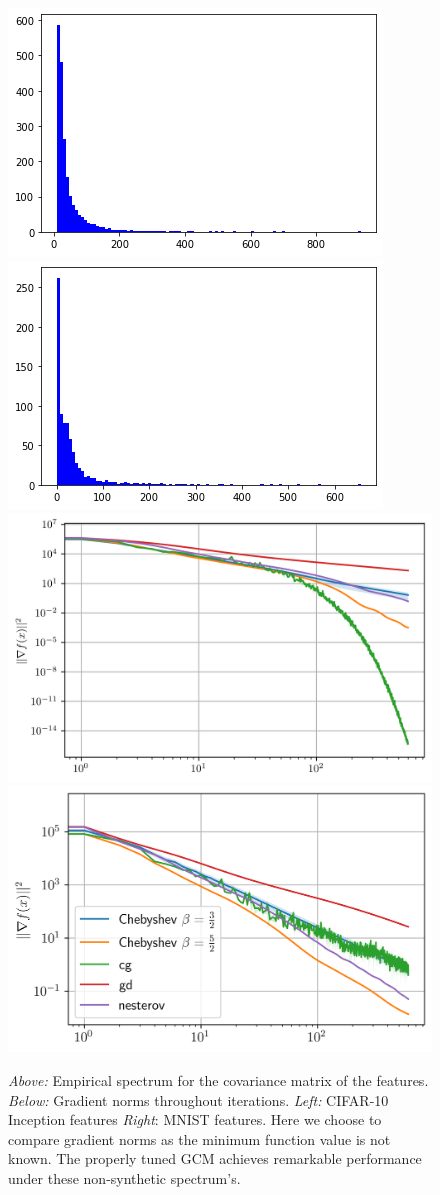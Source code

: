 \documentclass{article}
\begin{document}
\begin{figure}[h]
    \centering
    \includegraphics[width=5 cm]{imgs/inception/spectrum.png}\includegraphics[width= 5 cm]{imgs/mnist/spectrum.png}
    \includegraphics[width=5 cm]{new_imgs/inception.png}\includegraphics[width= 5 cm]{new_imgs/new_mnist.png}
    \caption{\textit{Above:} Empirical spectrum for the covariance matrix of the features. \textit{Below:} Gradient norms throughout iterations. \textit{Left:} CIFAR-10 Inception features \textit{Right}: MNIST features. Here we choose to compare gradient norms as the minimum function value is not known. The properly tuned GCM achieves remarkable performance under these non-synthetic spectrum's.
}
    \label{fig: real data}
\end{figure}
\end{document}
